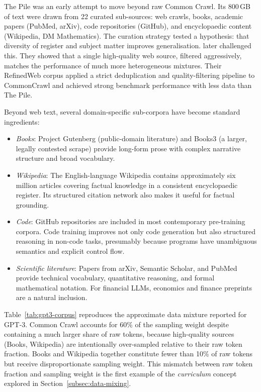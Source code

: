 \begin{context}
The Pile \cite{gao2020pile} was an early attempt to move beyond raw Common Crawl.
Its 800\,GB of text were drawn from 22 curated sub-sources: web crawls,
books, academic papers (PubMed, arXiv), code repositories (GitHub), and
encyclopaedic content (Wikipedia, DM Mathematics).  The curation strategy
tested a hypothesis: that diversity of register and subject matter improves
generalisation.  \citet{penedo2023refinedweb} later challenged this.  They
showed that a single high-quality web source, filtered aggressively, matches
the performance of much more heterogeneous mixtures.  Their RefinedWeb corpus
applied a strict deduplication and quality-filtering pipeline to CommonCrawl
and achieved strong benchmark performance with less data than The Pile.

Beyond web text, several domain-specific sub-corpora have become standard
ingredients:

\begin{itemize}
  \item \emph{Books}: Project Gutenberg (public-domain literature) and
        Books3 (a larger, legally contested scrape) provide long-form prose
        with complex narrative structure and broad vocabulary.

  \item \emph{Wikipedia}: The English-language Wikipedia contains
        approximately six million articles covering factual knowledge in a
        consistent encyclopaedic register.  Its structured citation network
        also makes it useful for factual grounding.

  \item \emph{Code}: GitHub repositories are included in most contemporary
        pre-training corpora.  Code training improves not only code generation
        but also structured reasoning in non-code tasks, presumably because
        programs have unambiguous semantics and explicit control flow.

  \item \emph{Scientific literature}: Papers from arXiv, Semantic Scholar,
        and PubMed provide technical vocabulary, quantitative reasoning, and
        formal mathematical notation.  For financial LLMs, economics and
        finance preprints are a natural inclusion.
\end{itemize}

\begin{example}
\label{ex:corpus-composition}
Table~\ref{tab:gpt3-corpus} reproduces the approximate data mixture reported
for GPT-3.  Common Crawl accounts for 60\% of the sampling weight despite
containing a much larger share of raw tokens, because high-quality sources
(Books, Wikipedia) are intentionally over-sampled relative to their raw token
fraction.  Books and Wikipedia together constitute fewer than 10\% of raw tokens
but receive disproportionate sampling weight.  This mismatch between raw token
fraction and sampling weight is the first example of the \emph{curriculum}
concept explored in Section~\ref{subsec:data-mixing}.


\end{example}
\end{context}
